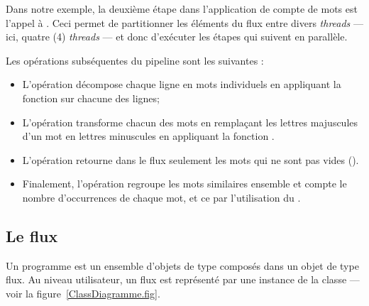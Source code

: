 Dans notre exemple, la deuxi\`eme \'etape dans l'application de compte de mots est l'appel \`a . Ceci permet de partitionner les \'el\'ements du flux entre divers \emph{threads} --- ici, quatre (4) \emph{threads} --- et donc d'ex\'ecuter les \'etapes qui suivent en parall\`ele. 

Les op\'erations subs\'equentes du pipeline sont les suivantes :
\begin{itemize}

\item L'op\'eration  d\'ecompose chaque ligne en mots individuels en appliquant la fonction  sur chacune des lignes;

\item L'op\'eration  transforme chacun des mots en rempla\c{c}ant les lettres majuscules d'un mot en lettres minuscules en appliquant la fonction .

\item L'op\'eration  retourne dans le flux seulement les mots qui ne sont pas vides ().



\item Finalement, l'op\'eration   regroupe les mots similaires ensemble et compte le nombre d'occurrences de chaque mot, et ce par l'utilisation du  . 
\end{itemize}





\subsection{Le flux}


Un programme \PpFf{} est un ensemble d'objets de type  compos\'es dans un objet de type flux. Au niveau utilisateur, un flux est repr\'esent\'e par une instance de la classe  --- voir la figure~\ref{ClassDiagramme.fig}. 




